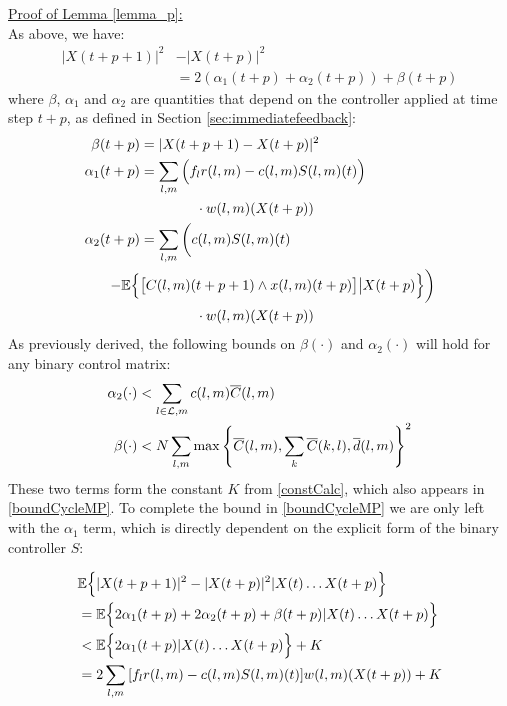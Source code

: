 \underline{Proof of Lemma \ref{lemma_p}:} \\
As above, we have:
\begin{align} \label{immediate_to_bound} 
 |X(t+ p + 1)|^{2} &- |X(t + p)|^{2} \\  \nonumber
 & = 2(\alpha_1(t + p)+\alpha_2(t + p)) + \beta(t + p)   
\end{align}
where $\beta$, $\alpha_{1}$ and $\alpha_{2}$ are quantities that depend on the controller applied at time step $t + p$, as defined in Section \ref{sec:immediatefeedback}:
\begin{align*}
\beta (t+p)  &= \vert X(t + p + 1) - X(t + p) \vert^{2} \\
\alpha_{1} (t+p) &=  \sum_{l,m} \Big(f_{l}r(l,m) - c(l,m)S(l,m)(t)\Big)\\ 
& \qquad \qquad \cdot w(l,m)(X(t + p)) \\
 \alpha_{2}  (t+p)&= \sum_{l,m} \bigg(c(l,m)S(l,m)(t) \\ 
 - \mathbb{E}\Big\{  & \big[C(l,m)(t+p + 1)\wedge x(l,m)(t + p)\big] \big| X(t + p)  \Big\}\bigg)\\
&\qquad \qquad \cdot w(l,m)(X(t + p))
 \end{align*}
As previously derived, the following bounds on $\beta(\cdot)$ and $\alpha_2(\cdot)$ will hold for any binary control matrix: 
\begin{align}
\label{a2bound_original} \alpha_2 (\cdot)&<  \sum_{l \in \linkset,m} c(l,m)\overline{C} (l,m) \\ 
\label{bbound_original} \beta (\cdot)  &<  N \displaystyle\sum_{l,m} \max\left\{ \overline{C}(l,m), \sum_{k} \overline{C}(k,l),  \overline d (l,m) \right\}^2
\end{align}
These two terms form the constant $K$ from \eqref{constCalc}, which also appears in \eqref{boundCycleMP}. To complete the bound in  \eqref{boundCycleMP} we are only left with the $\alpha_1$ term, which is directly dependent on the explicit form of the binary controller $S$:

\begin{align}
\nonumber
&\expectation{\vert X(t + p + 1)\vert^2 - \vert X(t + p)\vert^2 \vert X(t) \ldots X(t + p)} \\
\nonumber
& = \expectation{ 2\alpha_{1} (t+p) + 2\alpha_{2}(t+p) +\beta (t+p)    \vert  X(t) \ldots X(t + p)  }\\
\nonumber
&< \expectation{2\alpha_{1} (t+p) \vert X(t) \ldots X(t + p) } + K \\
&= 2\sum_{l,m} {[f_{l}r(l,m) - c(l,m)S(l,m)(t) ]w(l,m)(X(t + p))} + K \label{withK}
\end{align}

